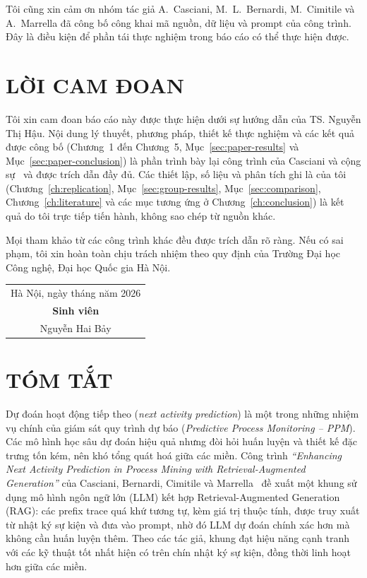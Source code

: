 \documentclass[a4paper,12pt,oneside]{report}
\newcommand{\eng}[1]{(\textit{#1})}
\newcommand{\reporttitle}{Enhancing Next Activity Prediction in Process Mining with Retrieval-Augmented Generation}
\newcommand{\studentname}{Nguyễn Hai Bảy}
\newcommand{\supervisor}{TS. Nguyễn Thị Hậu}
\begin{document}
Tôi cũng xin cảm ơn nhóm tác giả A.~Casciani, M.~L.~Bernardi, M.~Cimitile và A.~Marrella đã công bố công khai mã nguồn, dữ liệu và prompt của công trình. Đây là điều kiện để phần tái thực nghiệm trong báo cáo có thể thực hiện được.

\clearpage
\chapter*{LỜI CAM ĐOAN}

Tôi xin cam đoan báo cáo này được thực hiện dưới sự hướng dẫn của \supervisor. Nội dung lý thuyết, phương pháp, thiết kế thực nghiệm và các kết quả được công bố (Chương~1 đến Chương~5, Mục~\ref{sec:paper-results} và Mục~\ref{sec:paper-conclusion}) là phần trình bày lại công trình của Casciani và cộng sự~\cite{casciani2026} và được trích dẫn đầy đủ. Các thiết lập, số liệu và phân tích ghi là của tôi (Chương~\ref{ch:replication}, Mục~\ref{sec:group-results}, Mục~\ref{sec:comparison}, Chương~\ref{ch:literature} và các mục tương ứng ở Chương~\ref{ch:conclusion}) là kết quả do tôi trực tiếp tiến hành, không sao chép từ nguồn khác.

Mọi tham khảo từ các công trình khác đều được trích dẫn rõ ràng. Nếu có sai phạm, tôi xin hoàn toàn chịu trách nhiệm theo quy định của Trường Đại học Công nghệ, Đại học Quốc gia Hà Nội.

\vspace{1cm}
\begin{flushright}
\begin{tabular}{c}
Hà Nội, ngày \hspace{0.9cm} tháng \hspace{0.9cm} năm 2026\\[0.2cm]
\textbf{Sinh viên}\\[1.8cm]
\studentname
\end{tabular}
\end{flushright}

\clearpage
\chapter*{TÓM TẮT}

Dự đoán hoạt động tiếp theo \eng{next activity prediction} là một trong những nhiệm vụ chính của giám sát quy trình dự báo \eng{Predictive Process Monitoring -- PPM}. Các mô hình học sâu dự đoán hiệu quả nhưng đòi hỏi huấn luyện và thiết kế đặc trưng tốn kém, nên khó tổng quát hoá giữa các miền. Công trình \textit{``\reporttitle''} của Casciani, Bernardi, Cimitile và Marrella~\cite{casciani2026} đề xuất một khung sử dụng mô hình ngôn ngữ lớn (LLM) kết hợp Retrieval-Augmented Generation (RAG): các prefix trace quá khứ tương tự, kèm giá trị thuộc tính, được truy xuất từ nhật ký sự kiện và đưa vào prompt, nhờ đó LLM dự đoán chính xác hơn mà không cần huấn luyện thêm. Theo các tác giả, khung đạt hiệu năng cạnh tranh với các kỹ thuật tốt nhất hiện có trên chín nhật ký sự kiện, đồng thời linh hoạt hơn giữa các miền.
\end{document}
